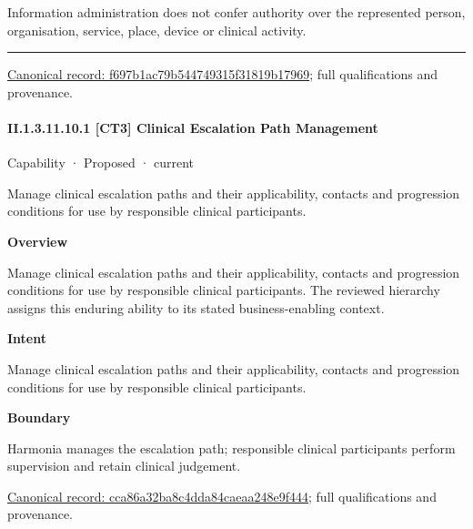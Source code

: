 Information administration does not confer authority over the represented person, organisation, service, place, device or clinical activity.



\medskip\hrule\medskip

{\footnotesize \href{../../../../continuum/strategy/capability/f697b1ac79b544749315f31819b17969.md}{Canonical record: f697b1ac79b544749315f31819b17969}; full qualifications and provenance.}\par
\paragraph*{II.1.3.11.10.1 [CT3] Clinical Escalation Path Management}
\label{navigation:II.1.3.11.10.1}

\label{element:cca86a32ba8c4dda84caeaa248e9f444}
{\small Capability · Proposed · current}\par

Manage clinical escalation paths and their applicability, contacts and progression conditions for use by responsible clinical participants.



\textbf{Overview}



Manage clinical escalation paths and their applicability, contacts and progression conditions for use by responsible clinical participants. The reviewed hierarchy assigns this enduring ability to its stated business-enabling context.



\textbf{Intent}



Manage clinical escalation paths and their applicability, contacts and progression conditions for use by responsible clinical participants.



\textbf{Boundary}



Harmonia manages the escalation path; responsible clinical participants perform supervision and retain clinical judgement.


{\footnotesize \href{../../../../continuum/strategy/capability/cca86a32ba8c4dda84caeaa248e9f444.md}{Canonical record: cca86a32ba8c4dda84caeaa248e9f444}; full qualifications and provenance.}\par

